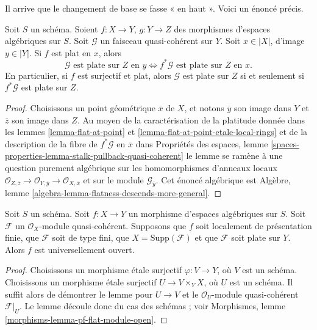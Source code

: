 \noindent
Il arrive que le changement de base se fasse « en haut ». Voici un énoncé précis.

\begin{lemma}
\label{lemma-flat-permanence}
Soit $S$ un schéma. Soient $f : X \to Y$, $g : Y \to Z$ des morphismes
d'espaces algébriques sur $S$. Soit $\mathcal{G}$ un faisceau quasi-cohérent sur $Y$.
Soit $x \in |X|$, d'image $y \in |Y|$.
Si $f$ est plat en $x$, alors
$$
\mathcal{G}\text{ est plate sur }Z\text{ en }y
\Leftrightarrow
f^*\mathcal{G}\text{ est plate sur }Z\text{ en }x.
$$
En particulier, si $f$ est surjectif et plat, alors
$\mathcal{G}$ est plate sur $Z$ si et seulement si
$f^*\mathcal{G}$ est plate sur $Z$.
\end{lemma}

\begin{proof}
Choisissons un point géométrique $\overline{x}$ de $X$, et notons
$\overline{y}$ son image dans $Y$ et $\overline{z}$ son image dans $Z$.
Au moyen de la caractérisation de la platitude donnée dans les
lemmes \ref{lemma-flat-at-point} et
\ref{lemma-flat-at-point-etale-local-rings}
et de la description de la fibre de $f^*\mathcal{G}$ en $\overline{x}$ dans
Propriétés des espaces,
lemme \ref{spaces-properties-lemma-stalk-pullback-quasi-coherent}
le lemme se ramène à une question purement algébrique sur les homomorphismes
d'anneaux locaux
$\mathcal{O}_{Z, \overline{z}} \to \mathcal{O}_{Y, \overline{y}}
\to \mathcal{O}_{X, \overline{x}}$
et sur le module $\mathcal{G}_{\overline{y}}$.
Cet énoncé algébrique est
Algèbre, lemme \ref{algebra-lemma-flatness-descends-more-general}.
\end{proof}

\begin{lemma}
\label{lemma-pf-flat-module-open}
Soit $S$ un schéma.
Soit $f : X \to Y$ un morphisme d'espaces algébriques sur $S$.
Soit $\mathcal{F}$ un $\mathcal{O}_X$-module quasi-cohérent.
Supposons que $f$ soit localement de présentation finie, que $\mathcal{F}$ soit de
type fini, que $X = \text{Supp}(\mathcal{F})$ et que
$\mathcal{F}$ soit plate sur $Y$. Alors $f$ est universellement ouvert.
\end{lemma}

\begin{proof}
Choisissons un morphisme étale surjectif $\varphi : V \to Y$, où $V$ est un schéma.
Choisissons un morphisme étale surjectif $U \to V \times_Y X$, où $U$ est un schéma.
Il suffit alors de démontrer le lemme pour $U \to V$ et le
$\mathcal{O}_U$-module quasi-cohérent $\mathcal{F}|_U$.
Le lemme découle donc du cas des schémas ; voir
Morphismes, lemme \ref{morphisms-lemma-pf-flat-module-open}.
\end{proof}






